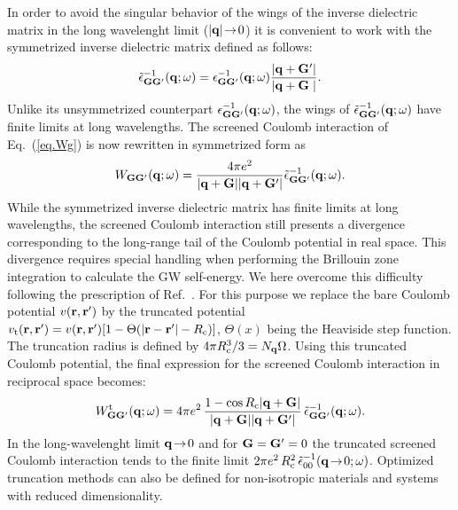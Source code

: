 \documentclass[twocolumn,prb,showpacs,superscriptaddress]{revtex4}
\def\w{\omega}
\def\q{{\bf q}}
\def\G{{\bf G}}
\def\Gp{{\bf G^\prime}}
\def\r{{\bf r}}
\def\rp{{\bf r^\prime}}
\begin{document}
In order to avoid the singular behavior of the wings of the inverse dielectric matrix 
in the long wavelenght limit ($|\q|\!\rightarrow\!0$) it is convenient to work with
the symmetrized inverse dielectric matrix defined as follows:\cite{balde_tosa}
  \begin{equation}
  \tilde\epsilon^{-1}_{\G\Gp}(\q;\w) = \epsilon^{-1}_{\G\Gp}(\q;\w)  \frac{|\q+\Gp|}{|\q+\G\phantom{^\prime}|}.
  \end{equation}
Unlike its unsymmetrized counterpart $\epsilon^{-1}_{\G\Gp}(\q;\w)$,
the wings of $\tilde\epsilon^{-1}_{\G\Gp}(\q;\w)$ have finite limits 
at long wavelengths.
%
The screened Coulomb interaction of Eq.\ (\ref{eq.Wg}) is now rewritten in symmetrized form
as
  \begin{equation}\label{eq.Wg_symm}
  W_{\G\Gp}(\q;\w) = \frac{4\pi e^2}{|\q+\G||\q+\Gp|}  \tilde\epsilon^{-1}_{\G\Gp}(\q;\w).
  \end{equation}
While the symmetrized inverse dielectric matrix has finite limits at long wavelengths,
the screened Coulomb interaction still presents a divergence corresponding to the
long-range tail of the Coulomb potential in real space. This divergence requires special
handling when performing the Brillouin zone integration to calculate 
the GW self-energy.\cite{hl86}
We here overcome this difficulty following the prescription of
Ref.~. For this purpose we replace
the bare Coulomb potential $v(\r,\rp)$ by the truncated potential 
$v_{\rm t}(\r,\rp)=v(\r,\rp)[1-\Theta(|\r-\rp|-R_{\rm c})]$, 
$\Theta(x)$ being the Heaviside step function.
The truncation radius is defined by $4\pi R_{\rm c}^3/3=N_\q\Omega$. 
Using this truncated Coulomb potential, the final expression for the screened 
Coulomb interaction in reciprocal space becomes:
  \begin{equation}\label{eq.Wg_symm}
  W^{\rm t}_{\G\Gp}(\q;\w) = 4\pi e^2 \, \frac{1-\cos{R_{\rm c}|\q+\G|}}{|\q+\G||\q+\Gp|}\,
     \tilde\epsilon^{-1}_{\G\Gp}(\q;\w).
  \end{equation}
In the long-wavelenght limit $\q\!\rightarrow\!0$ and for $\G=\Gp=0$ the truncated
screened Coulomb interaction tends to
the finite limit 
$2\pi e^2 \, R_{\rm c}^2 \, \tilde\epsilon^{-1}_{00}(\q\!\rightarrow\!0;\w)$.
Optimized truncation methods can also be defined for non-isotropic materials
and systems with reduced dimensionality.\cite{sohrab}
\end{document}
